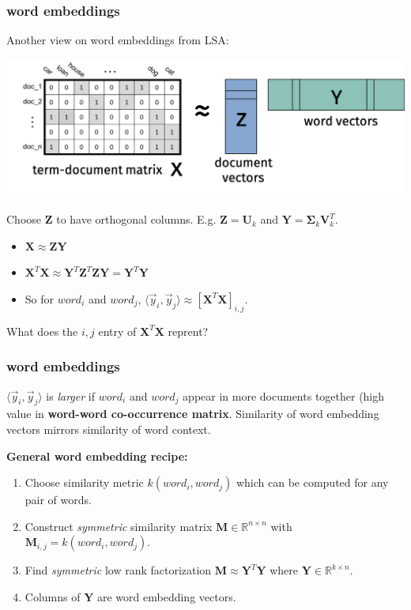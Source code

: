 \documentclass[handout,compress]{beamer}
\newcommand{\bs}[1]{\boldsymbol{#1}}
\newcommand{\bv}[1]{\mathbf{#1}}
\newcommand{\R}{\mathbb{R}}
\begin{document}
\begin{frame}
	\frametitle{word embeddings}
	\small
	Another view on word embeddings from LSA:
	\begin{center}
		\includegraphics[width=.8\textwidth]{mylsa2.png}
	\end{center}
	Choose $\bv{Z}$ to have orthogonal columns. E.g. $\bv{Z} = \bv{U}_k$ and $\bv{Y} = \bs{\Sigma}_k\bv{V}_k^T$.
	\begin{itemize}
		\item $\bv{X} \approx \bv{Z}\bv{Y}$
		\item $\bv{X}^T\bv{X} \approx \bv{Y}^T\bv{Z}^T\bv{Z}\bv{Y} = \bv{Y}^T\bv{Y}$
		\item So for $word_i$ and $word_j$, $\langle \vec{y}_i, \vec{y}_j\rangle \approx [\bv{X}^T\bv{X}]_{i,j}$.   
	\end{itemize}
\vspace{-.5em}
	\begin{center}
		\large
	\alert{What does the $i,j$ entry of $\bv{X}^T\bv{X}$ reprent?}
\end{center}
\end{frame}

\begin{frame}
	\frametitle{word embeddings}
	\small
	$\langle \vec{y}_i, \vec{y}_j\rangle$ is \emph{larger} if $word_i$ and $word_j$ appear in more documents together (high value in \textbf{word-word co-occurrence matrix}. Similarity of word embedding vectors mirrors similarity of word context.
	
	\textbf{General word embedding recipe:}
	\begin{enumerate}
		\item Choose similarity metric $k(word_i,word_j)$ which can be computed for any pair of words. 
		\item Construct \emph{symmetric} similarity matrix $\bv{M} \in \R^{n\times n}$ with $\bv{M}_{i,j} = k(word_i,word_j)$. 
		\item Find \emph{symmetric} low rank factorization $\bv{M} \approx \bv{Y}^T\bv{Y}$ where $\bv{Y} \in \R^{k\times n}$. 
		\item Columns of $\bv{Y}$ are word embedding vectors. 
	\end{enumerate}
\end{frame}
\end{document}
